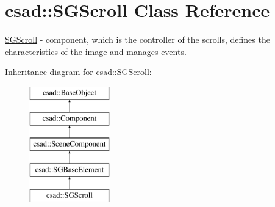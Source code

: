\hypertarget{classcsad_1_1_s_g_scroll}{\section{csad\-:\-:S\-G\-Scroll Class Reference}
\label{classcsad_1_1_s_g_scroll}
}


\hyperlink{classcsad_1_1_s_g_scroll}{S\-G\-Scroll} -\/ component, which is the controller of the scrolls, defines the characteristics of the image and manages events.  


Inheritance diagram for csad\-:\-:S\-G\-Scroll\-:\begin{figure}[H]
\begin{center}
\leavevmode
\includegraphics[height=5.000000cm]{classcsad_1_1_s_g_scroll}
\end{center}
\end{figure}
